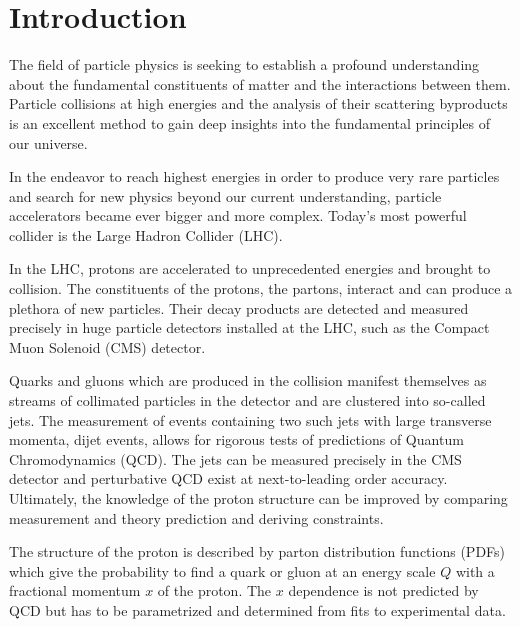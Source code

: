 
\chapter{Introduction}

The field of particle physics is seeking to establish a profound understanding
about the fundamental constituents of matter and the interactions
between them. Particle collisions at high energies and the analysis of
their scattering byproducts is an excellent method to gain deep insights into
the fundamental principles of our universe.

In the endeavor to reach highest energies in order to produce very rare
particles and search for new physics beyond our current understanding, particle accelerators became ever bigger
and more complex. Today's most powerful collider is the Large Hadron Collider
(LHC).

In the LHC, protons are accelerated to unprecedented energies and brought to
collision. The constituents of the protons, the partons, interact and can
produce a plethora of new particles. Their decay products are detected and
measured precisely in huge particle detectors installed at the LHC, such as the
Compact Muon Solenoid (CMS) detector.

Quarks and gluons which are produced in the collision manifest themselves as
streams of collimated particles in the detector and are clustered into so-called
jets. The measurement of events containing two such jets with large
transverse momenta, dijet events, allows for rigorous tests of predictions of
Quantum Chromodynamics (QCD). The jets can be measured precisely in the CMS
detector and perturbative QCD exist at next-to-leading order accuracy.
Ultimately, the knowledge of the proton structure can be improved by comparing
measurement and theory prediction and deriving constraints.

The structure of the proton is described by parton distribution functions (PDFs) which
give the probability to find a quark or gluon at an energy scale $Q$ with a fractional
momentum $x$ of the proton. The $x$ dependence is not predicted by QCD but has
to be parametrized and determined from fits to experimental data.

